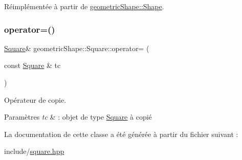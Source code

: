 Réimplémentée à partir de \hyperlink{classgeometric_shape_1_1_shape_af666bd629db0595afa79982548b6cf78}{geometric\+Shape\+::\+Shape}.

\mbox{\label{classgeometric_shape_1_1_square_a6d6c18d6f3b6e93db5e9a9def16c701c}} 
\subsubsection{\texorpdfstring{operator=()}{operator=()}}
{\footnotesize\ttfamily \hyperlink{classgeometric_shape_1_1_square}{Square}\& geometric\+Shape\+::\+Square\+::operator= (\begin{DoxyParamCaption}\item[{const \hyperlink{classgeometric_shape_1_1_square}{Square} \&}]{tc }\end{DoxyParamCaption})}



Opérateur de copie. 


\begin{DoxyParams}{Paramètres}
{\em tc} & \+: objet de type \hyperlink{classgeometric_shape_1_1_square}{Square} à copié \\
\hline
\end{DoxyParams}


La documentation de cette classe a été générée à partir du fichier suivant \+:\begin{DoxyCompactItemize}
\item 
include/\hyperlink{square_8hpp}{square.\+hpp}\end{DoxyCompactItemize}

